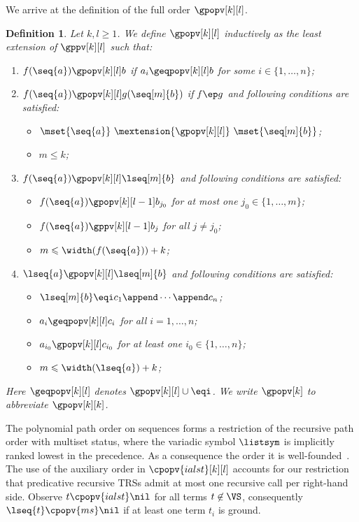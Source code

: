 \documentclass{LMCS}
\newtheorem{definition}[thm]{Definition}
\begin{document}
\noindent We arrive at the definition of the full order $\gpopv[k][l]$.
\begin{definition}\label{d:gpopv} 
  Let $k,l \geqslant 1$.
  We define $\gpopv[k][l]$ inductively as the least extension of $\gppv[k][l]$ such that:
  \begin{enumerate}[labelsep=*,leftmargin=*]
  \item\label{d:gpopv:st}
    $f(\seq{a}) \gpopv[k][l] b$ if $a_i \geqpopv[k][l] b$ for some $i \in \{1,\dots,n\}$;
  \item\label{d:gpopv:ep}
    $f(\seq{a}) \gpopv[k][l] g(\seq[m]{b})$ if $f \ep g$ 
    and following conditions are satisfied: 
    \begin{itemize}
    \item $\mset{\seq{a}}~\mextension{\gpopv[k][l]}~\mset{\seq[m]{b}}$;
    \item $m \leqslant k$;
    \end{itemize}
  \item\label{d:gpopv:ialst} 
    $f(\seq{a}) \gpopv[k][l] \lseq[m]{b}$ 
    and following conditions are satisfied: 
    \begin{itemize}
    \item $f(\seq{a}) \gpopv[k][l-1] b_{j_0}$ for at most one $j_0 \in\{1,\dots,m\}$;
    \item $f(\seq{a}) \gppv[k][l-1] b_j$ for all $j \neq j_0$;
    \item $m \leqslant \width(f(\seq{a})) + k$;
    \end{itemize}
  \item\label{d:gpopv:ms} 
    $\lseq{a} \gpopv[k][l]  \lseq[m]{b}$
    and following conditions are satisfied: 
    \begin{itemize}
    \item $\lseq[m]{b} \eqi c_1 \append \cdots \append c_n$;
    \item $a_i \geqpopv[k][l] c_i$ for all $i = 1,\dots, n$; \item $a_{i_0} \gpopv[k][l] c_{i_0}$ for at least one $i_0 \in \{1,\dots, n\}$; \item $m \leqslant \width(\lseq{a}) + k$;
    \end{itemize}
  \end{enumerate}
  Here ${\geqpopv[k][l]}$ denotes ${\gpopv[k][l]} \cup {\eqi}$. 
  We write $\gpopv[k]$ to abbreviate $\gpopv[k][k]$.
\end{definition}

The polynomial path order on sequences forms a restriction of the recursive path order with 
multiset status, where the variadic symbol $\listsym$ is implicitly 
ranked lowest in the precedence. As a consequence the order
it is well-founded~\cite{Ferreira95}.
The use of the auxiliary order in $\cpopv{ialst}[k][l]$ accounts 
for our restriction that predicative recursive TRSs admit at most one 
recursive call per right-hand side.
Observe $t \cpopv{ialst} \nil$ for all terms $t \not \in \VS$, 
consequently $\lseq{t} \cpopv{ms} \nil$  if at least one term $t_i$ is ground.
\end{document}
